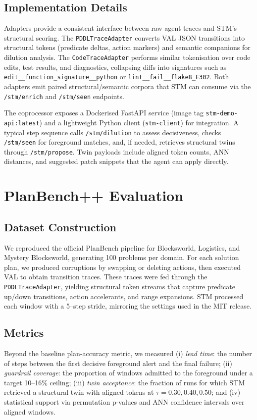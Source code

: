 \documentclass[11pt]{article}
\begin{document}
\subsection{Implementation Details}
Adapters provide a consistent interface between raw agent traces and STM's structural scoring. The \texttt{PDDLTraceAdapter} converts VAL JSON transitions into structural tokens (predicate deltas, action markers) and semantic companions for dilution analysis. The \texttt{CodeTraceAdapter} performs similar tokenisation over code edits, test results, and diagnostics, collapsing diffs into signatures such as \texttt{edit\_\_function\_signature\_\_python} or \texttt{lint\_\_fail\_\_flake8\_E302}. Both adapters emit paired structural/semantic corpora that STM can consume via the \texttt{/stm/enrich} and \texttt{/stm/seen} endpoints.

The coprocessor exposes a Dockerised FastAPI service (image tag \texttt{stm-demo-api:latest}) and a lightweight Python client (\texttt{stm-client}) for integration. A typical step sequence calls \texttt{/stm/dilution} to assess decisiveness, checks \texttt{/stm/seen} for foreground matches, and, if needed, retrieves structural twins through \texttt{/stm/propose}. Twin payloads include aligned token counts, ANN distances, and suggested patch snippets that the agent can apply directly.

\section{PlanBench++ Evaluation}
\subsection{Dataset Construction}
We reproduced the official PlanBench pipeline for Blocksworld, Logistics, and Mystery Blocksworld, generating 100 problems per domain. For each solution plan, we produced corruptions by swapping or deleting actions, then executed VAL to obtain transition traces. These traces were fed through the \texttt{PDDLTraceAdapter}, yielding structural token streams that capture predicate up/down transitions, action accelerants, and range expansions. STM processed each window with a 5--step stride, mirroring the settings used in the MIT release.

\subsection{Metrics}
Beyond the baseline plan-accuracy metric, we measured (i) \emph{lead time}: the number of steps between the first decisive foreground alert and the final failure; (ii) \emph{guardrail coverage}: the proportion of windows admitted to the foreground under a target 10--16\% ceiling; (iii) \emph{twin acceptance}: the fraction of runs for which STM retrieved a structural twin with aligned tokens at \(\tau=0.30,0.40,0.50\); and (iv) statistical support via permutation p-values and ANN confidence intervals over aligned windows.
\end{document}

